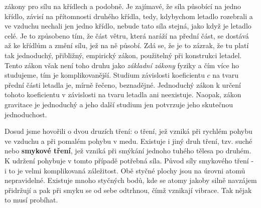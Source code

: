 {    zákony pro sílu na křídlech a podobně. Je zajímavé, že síla působící na jedno křídlo, závisí na 
    přítomnosti druhého křídla, tedy, kdybychom letadlo rozebrali a ve vzduchu nechali jen jedno 
    křídlo, nebude tato síla stejná, jako když je letadlo celé. Je to způsobeno tím, že část větru, 
    která naráží na přední část, se dostává až ke křídlům a změní sílu, jež na ně působí. Zdá se, 
    že je to zázrak, že tu platí tak jednoduchý, přibližný, empirický zákon, použitelný při 
    konstrukci letadel. Tento zákon však není toho druhu jako \emph{základní zákony} fyziky a čím 
    více ho studujeme, tím je komplikovanější. Studium závislosti koeficientu \(c\) na tvaru přední 
    části letadla je, mírně řečeno, beznadějné. Jednoduchý zákon k určení tohoto koeficientu v 
    závislosti na tvaru letadla ani neexistuje. Naopak, zákon gravitace je jednoduchý a jeho další 
    studium jen potvrzuje jeho skutečnou jednoduchost.
    
    Dosud jsme hovořili o dvou druzích tření: o tření, jež vzniká při rychlém pohybu ve vzduchu a 
    při pomalém pohybu v medu. Existuje i jiný druh tření, tzv. suché nebo \textbf{smykové tření}, 
    jež vzniká při smýkání jednoho tuhého tělesa po druhém. K udržení pohybuje v tomto případě 
    potřebná síla. Původ síly smykového tření - i to je velmi komplikovaná záležitost. Obě styčné 
    plochy jsou na úrovni atomů nepravidelné. Existuje mnoho styčných bodů, kde se atomy jakoby 
    silně navzájem přidržují a pak při smyku se od sebe odtrhnou, čímž vznikají vibrace. Tak nějak 
    to musí probíhat.
    
}
